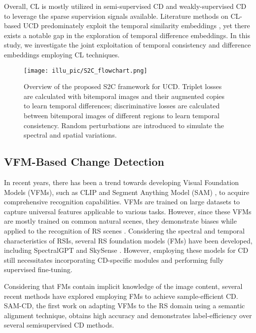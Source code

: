 Overall, CL is mostly utilized in semi-supervised CD \cite{yang2023revisiting, bandara2022revisiting} and weakly-supervised CD ~\cite{zhao2024pixellevel} to leverage the sparse supervision signals available. Literature methods on CL-based UCD predominately exploit the temporal similarity embeddings \cite{chen2021self}, yet there exists a notable gap in the exploration of temporal difference embeddings. In this study, we investigate the joint exploitation of temporal consistency and difference embeddings employing CL techniques.

\begin{figure*}[!t]
\centering
    \texttt{[image: illu\_pic/S2C\_flowchart.png]}
    \caption{Overview of the proposed S2C framework for UCD. Triplet losses are calculated with bitemporal images and their augmented copies to learn temporal differences; discriminative losses are calculated between bitemporal images of different regions to learn temporal consistency. Random perturbations are introduced to simulate the spectral and spatial variations.}
\label{fig.flowchar}
\end{figure*}


\subsection{VFM-Based Change Detection}

In recent years, there has been a trend towards developing Visual Foundation Models (VFMs), such as CLIP \cite{radford2021CLIP} and Segment Anything Model (SAM) \cite{Kirillov2023Segment}, to acquire comprehensive recognition capabilities. VFMs are trained on large datasets to capture universal features applicable to various tasks. However, since these VFMs are mostly trained on common natural scenes, they demonstrate biases while applied to the recognition of RS scenes \cite{ji2024segment}. Considering the spectral and temporal characteristics of RSIs, several RS foundation models (FMs) have been developed, including SpectralGPT \cite{hong2024spectralgpt} and SkySense \cite{guo2024skysense}. However, employing these models for CD still necessitates incorporating CD-specific modules and performing fully supervised fine-tuning.

Considering that FMs contain implicit knowledge of the image content, several recent methods have explored employing FMs to achieve sample-efficient CD. SAM-CD\cite{ding2024samcd}, the first work on adapting VFMs to the RS domain using a semantic alignment technique, obtains high accuracy and demonstrates label-efficiency over several semisupervised CD methods. 

